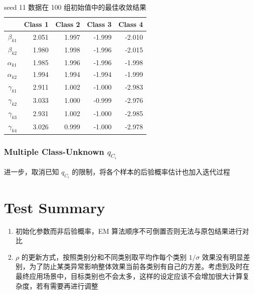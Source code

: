 \documentclass[12pt, a4paper, oneside]{article}
\numberwithin{equation}{section}
\begin{document}
\begin{table}[ht]
	\centering
	\caption{seed 11 数据在 100 组初始值中的最佳收敛结果}
	\vspace{0.2cm}
	\label{tb:best_coef_seed11}
	\begin{tabular}{rrrrr}
		\toprule
		& Class 1 & Class 2 & Class 3 & Class 4 \\ 
		\midrule
		$\beta_{k1}$ & 2.051 & 1.997 & -1.999 & -2.010 \\ 
		$\beta_{k2}$ & 1.980 & 1.998 & -1.996 & -2.015 \\ 
		$\alpha_{k1}$ & 1.985 & 1.996 & -1.996 & -1.998 \\ 
		$\alpha_{k2}$ & 1.994 & 1.994 & -1.994 & -1.999 \\ 
		$\gamma_{k1}$ & 2.911 & 1.002 & -1.000 & -2.983 \\ 
		$\gamma_{k2}$ & 3.033 & 1.000 & -0.999 & -2.976 \\ 
		$\gamma_{k3}$ & 2.931 & 1.002 & -1.000 & -2.985 \\ 
		$\gamma_{k4}$ & 3.026 & 0.999 & -1.000 & -2.978 \\ 
		\bottomrule
	\end{tabular}
\end{table}

\subsubsection{Multiple Class-Unknown $q_{C_i}$}

进一步，取消已知 $q_{C_i}$ 的限制，将各个样本的后验概率估计也加入迭代过程





\clearpage

\section{Test Summary}

\begin{enumerate}
	\item 初始化参数而非后验概率，EM 算法顺序不可倒置否则无法与原包结果进行对比
	\item $\rho$ 的更新方式，按照类别分和不同类别取平均作每个类别 $1/\sigma$ 效果没有明显差别，为了防止某类异常影响整体效果当前各类别有自己的方差。考虑到及时在最终应用场景中，目标类别也不会太多，这样的设定应该不会增加很大计算复杂度，若有需要再进行调整
\end{enumerate}



\newpage


\end{document}
